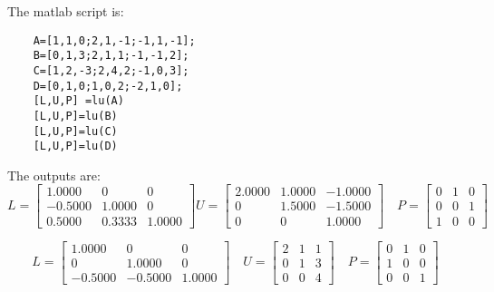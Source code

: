 \documentclass[UTF8]{ctexart}
\begin{document}
The matlab script is:
\begin{centering}
	\begin{lstlisting}
	A=[1,1,0;2,1,-1;-1,1,-1];
	B=[0,1,3;2,1,1;-1,-1,2];
	C=[1,2,-3;2,4,2;-1,0,3];
	D=[0,1,0;1,0,2;-2,1,0];
	[L,U,P] =lu(A)
	[L,U,P]=lu(B)
	[L,U,P]=lu(C)
	[L,U,P]=lu(D)
		\end{lstlisting}
\end{centering}

The outputs are:
\begin{equation*}L = \begin{bmatrix} 1.0000 &   0  & 0\\-0.5000    &1.0000        & 0\\0.5000  &  0.3333    &1.0000\end{bmatrix} U =\begin{bmatrix}2.0000 &   1.0000   &-1.0000\\   0  & 1.5000  & -1.5000\\ 0 &        0   & 1.0000\end{bmatrix}\quad P=\begin{bmatrix} 0   &  1     &0\\ 0    & 0   &  1\\ 1    & 0  &   0
\end{bmatrix}
\end{equation*}

\begin{equation*}L = \begin{bmatrix} 1.0000 &0  & 0\\    0  &  1.0000      &   0\\-0.5000  &  -0.5000    &1.0000\end{bmatrix}\quad U =\begin{bmatrix} 2  &   1     &1\\    0   &  1   &  3\\      0  &   0     &4\end{bmatrix}\quad P=\begin{bmatrix} 0   &  1     &0\\ 1    & 0   & 0\\ 0   & 0  &  1
\end{bmatrix}
\end{equation*}
\end{document}
